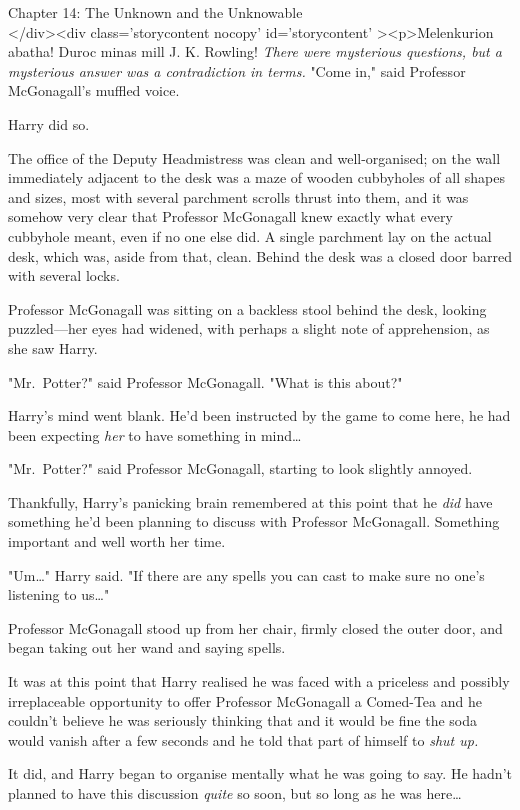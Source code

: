 
Chapter 14: The Unknown and the Unknowable\\
</div><div  class='storycontent nocopy' id='storycontent' ><p>Melenkurion abatha! Duroc minas mill J. K. Rowling!
\sbreak
\emph{There were mysterious questions, but a mysterious answer was a contradiction in terms.}
\sbreak
"Come in," said Professor McGonagall's muffled voice.

Harry did so.

The office of the Deputy Headmistress was clean and well-organised; on the wall immediately adjacent to the desk was a maze of wooden cubbyholes of all shapes and sizes, most with several parchment scrolls thrust into them, and it was somehow very clear that Professor McGonagall knew exactly what every cubbyhole meant, even if no one else did. A single parchment lay on the actual desk, which was, aside from that, clean. Behind the desk was a closed door barred with several locks.

Professor McGonagall was sitting on a backless stool behind the desk, looking puzzled---her eyes had widened, with perhaps a slight note of apprehension, as she saw Harry.

"Mr.~Potter?" said Professor McGonagall. "What is this about?"

Harry's mind went blank. He'd been instructed by the game to come here, he had been expecting \emph{her} to have something in mind{\ldots}

"Mr.~Potter?" said Professor McGonagall, starting to look slightly annoyed.

Thankfully, Harry's panicking brain remembered at this point that he \emph{did} have something he'd been planning to discuss with Professor McGonagall. Something important and well worth her time.

"Um{\ldots}" Harry said. "If there are any spells you can cast to make sure no one's listening to us{\ldots}"

Professor McGonagall stood up from her chair, firmly closed the outer door, and began taking out her wand and saying spells.

It was at this point that Harry realised he was faced with a priceless and possibly irreplaceable opportunity to offer Professor McGonagall a Comed-Tea and he couldn't believe he was seriously thinking that and it would be fine the soda would vanish after a few seconds and he told that part of himself to \emph{shut up.}

It did, and Harry began to organise mentally what he was going to say. He hadn't planned to have this discussion \emph{quite} so soon, but so long as he was here{\ldots}

